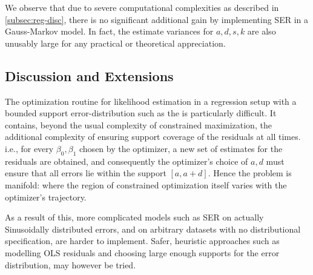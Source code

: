 We observe that due to severe computational complexities as described in \autoref{subsec:reg-disc}, there is no significant additional gain by implementing SER in a Gauss-Markov model. In fact, the estimate variances for $a,d,s,k$ are also unusably large for any practical or theoretical appreciation.

\subsection{Discussion and Extensions}\label{subsec:reg-disc}
The optimization routine for likelihood estimation in a regression setup with a bounded support error-distribution such as the \sindist{} is particularly difficult. It contains, beyond the usual complexity of constrained maximization, the additional complexity of ensuring support coverage of the residuals at all times. i.e., for every $\beta_0, \beta_1$ chosen by the optimizer, a new set of estimates for the residuals are obtained, and consequently the optimizer's choice of $a,d$ must ensure that all errors lie within the support $[a, a+d]$. Hence the problem is manifold: where the region of constrained optimization itself varies with the optimizer's trajectory.

As a result of this, more complicated models such as SER on actually Sinusoidally distributed errors, and on arbitrary datasets with no distributional specification, are harder to implement. Safer, heuristic approaches such as modelling OLS residuals and choosing large enough supports for the error distribution, may however be tried.